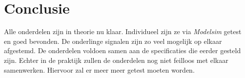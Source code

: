 \chapter{Conclusie}

Alle onderdelen zijn in theorie nu klaar. Individueel zijn ze via \emph{Modelsim} getest en goed bevonden. De onderlinge signalen zijn zo veel mogelijk op elkaar afgestemd. De onderdelen voldoen samen aan de specificaties die eerder gesteld zijn. Echter in de praktijk zullen de onderdelen nog niet feilloos met elkaar samenwerken. Hiervoor zal er meer meer getest moeten worden.
